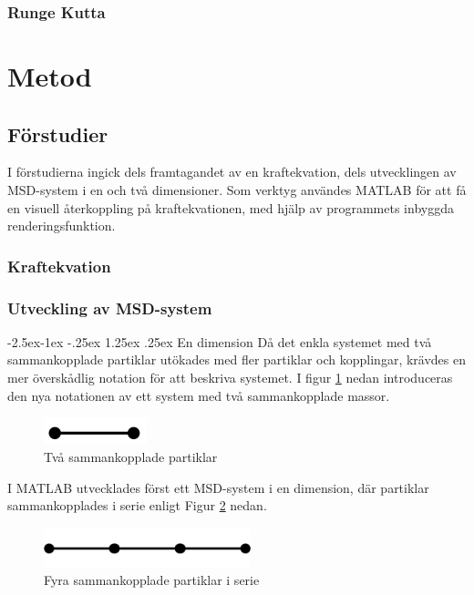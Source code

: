 \documentclass[a4paper,12pt,oneside,final,swedish]{extarticle}
\makeatletter
\renewcommand\paragraph{\@startsection{paragraph}{4}{\z@}%
            {-2.5ex\@plus -1ex \@minus -.25ex}%
            {1.25ex \@plus .25ex}%
            {\normalfont\normalsize\bfseries}}
\makeatother
\begin{document}
\subsubsection{Runge Kutta}%


\section{Metod}
\subsection{Förstudier}
I förstudierna ingick dels framtagandet av en kraftekvation, dels utvecklingen av MSD-system i en och två dimensioner. 
Som verktyg användes MATLAB för att få en visuell återkoppling på kraftekvationen, med hjälp av programmets inbyggda renderingsfunktion.

\subsubsection{Kraftekvation}
\subsubsection{Utveckling av MSD-system}
\paragraph{En dimension}
Då det enkla systemet med två sammankopplade partiklar utökades med fler partiklar och kopplingar, krävdes en mer överskådlig notation för att beskriva systemet. 
I figur \ref{2D_simple} nedan introduceras den nya notationen av ett system med två sammankopplade massor.

\begin{figure}[h!]
  \begin{center}
    \includegraphics[width=3cm]{Bilder/2D_simple.png} 
  \end{center}
  \caption{Två sammankopplade partiklar}
  \label{2D_simple}
\end{figure}
I MATLAB utvecklades först ett MSD-system i en dimension, där partiklar sammankopplades i serie enligt Figur \ref{simple1D4} nedan.

\begin{figure}[h!]
  \begin{center}
    \includegraphics[width=6cm]{Bilder/simple1D4.png} 
  \end{center}
  \caption{Fyra sammankopplade partiklar i serie}
  \label{simple1D4}
\end{figure}
\end{document}
